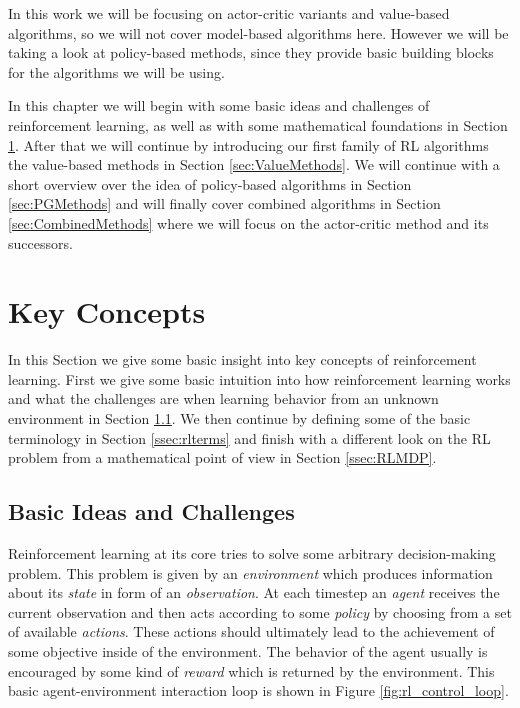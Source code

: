 In this work we will be focusing on actor-critic variants and value-based algorithms, so we will not cover model-based algorithms here. However we will be taking a look at policy-based methods, since they provide basic building blocks for the algorithms we will be using.

In this chapter we will begin with some basic ideas and challenges of reinforcement learning, as well as with some mathematical foundations in Section \ref{sec:concepts}. After that we will continue by introducing our first family of RL algorithms the value-based methods in Section \ref{sec:ValueMethods}. We will continue with a short overview over the idea of policy-based algorithms in Section \ref{sec:PGMethods} and will finally cover combined algorithms in Section \ref{sec:CombinedMethods} where we will focus on the actor-critic method and its successors.

\section{Key Concepts} \label{sec:concepts}
In this Section we give some basic insight into key concepts of reinforcement learning. First we give some basic intuition into how reinforcement learning works and what the challenges are when learning behavior from an unknown environment in Section \ref{ssec:rlidea}. We then continue by defining some of the basic terminology in Section \ref{ssec:rlterms} and finish with a different look on the RL problem from a mathematical point of view in Section \ref{ssec:RLMDP}.  

\subsection{Basic Ideas and Challenges} \label{ssec:rlidea}

Reinforcement learning at its core tries to solve some arbitrary decision-making problem. This problem is given by an \textit{environment} which produces information about its \textit{state} in form of an \textit{observation}. At each timestep an \textit{agent} receives the current observation and then acts according to some \textit{policy} by choosing from a set of available \textit{actions}. These actions should ultimately lead to the achievement of some objective inside of the environment. The behavior of the agent usually is encouraged by some kind of \textit{reward} which is returned by the environment. This basic agent-environment interaction loop is shown in Figure \ref{fig:rl_control_loop}.

